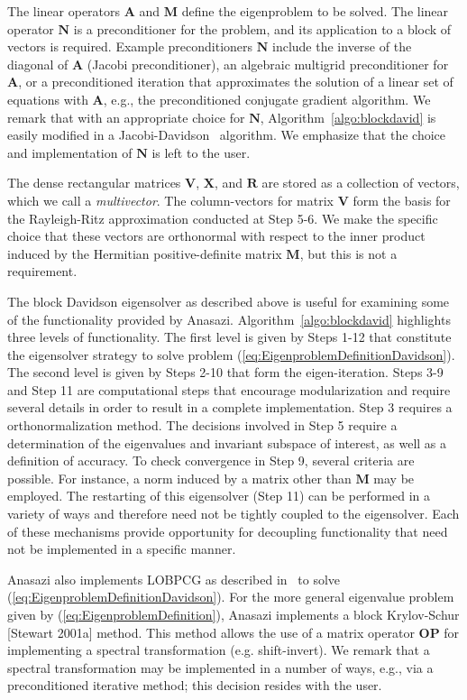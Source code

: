 \documentclass[acmtoms,acmnow]{acmtrans2m}
\begin{document}
The linear operators $\mathbf{A}$ and $\mathbf{M}$ define the
eigenproblem to be solved. The linear operator $\mathbf{N}$ is a
preconditioner for the problem, and its application to a block of
vectors is required. Example preconditioners $\mathbf{N}$ include
the inverse of the diagonal of $\mathbf{A}$ (Jacobi preconditioner),
an algebraic multigrid preconditioner for $\mathbf{A}$, or a
preconditioned iteration that approximates the solution of a linear
set of equations with $\mathbf{A}$, e.g., the preconditioned
conjugate gradient algorithm. We remark that with an appropriate
choice for $\mathbf{N}$, Algorithm~\ref{algo:blockdavid} is easily
modified in a Jacobi-Davidson~\cite{slvo:96} algorithm. We emphasize that
the choice and implementation of $\mathbf{N}$ is left to the user.

The dense rectangular matrices $\mathbf{V}$, $\mathbf{X}$, and
$\mathbf{R}$ are stored as a collection of vectors, which we call a
\emph{multivector}. 
The column-vectors for matrix $\mathbf{V}$ form
the basis for the Rayleigh-Ritz approximation conducted at Step 5-6.
We make the specific choice that these vectors are orthonormal with
respect to the inner product induced by the Hermitian
positive-definite matrix $\mathbf{M}$, but this is not a requirement.

The block Davidson eigensolver as described above is useful for
examining some of the functionality provided by 
Anasazi. Algorithm~\ref{algo:blockdavid}
highlights three levels of functionality. The first level is given
by Steps 1-12 that constitute the eigensolver strategy to solve
problem (\ref{eq:EigenproblemDefinitionDavidson}). 
The second level is given by Steps 2-10 that form the eigen-iteration.
Steps 3-9 and Step 11 are computational steps that encourage
modularization and require several details in order to result 
in a complete implementation.
Step 3 requires a orthonormalization method. The decisions involved
in Step 5 require a determination of the eigenvalues and invariant
subspace of interest, as well as a definition of accuracy. To check
convergence in Step 9, several criteria are possible. For instance,
a norm induced by a matrix other than $\mathbf{M}$ may be employed.
The restarting of this eigensolver (Step 11) can be performed in a
variety of ways and therefore need not be tightly coupled to the
eigensolver. Each of these mechanisms provide opportunity for
decoupling functionality that need not be implemented in a specific
manner.

Anasazi also implements LOBPCG as described in~\cite{Hetmaniuk:2006:BSL} to solve
(\ref{eq:EigenproblemDefinitionDavidson}).  For the more general eigenvalue problem given
by (\ref{eq:EigenproblemDefinition}), Anasazi implements a block Krylov-Schur [Stewart
2001a] method. This method allows the use of a matrix operator $\mathbf{OP}$ for
implementing a spectral transformation (e.g. shift-invert). We remark that a spectral
transformation may be implemented in a number of ways, e.g., via a preconditioned
iterative method; this decision resides with the user.
\end{document}
